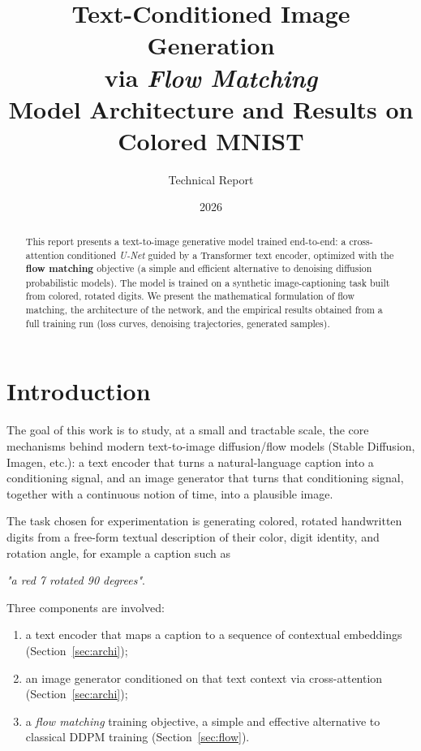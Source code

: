 \documentclass[11pt,a4paper]{article}
\title{\textbf{Text-Conditioned Image Generation\\ via \emph{Flow Matching}}\\[0.3em]
\large Model Architecture and Results on Colored MNIST}
\author{Technical Report}
\date{2026}
\begin{document}
\maketitle

\begin{abstract}
\noindent
This report presents a text-to-image generative model trained end-to-end: a
cross-attention conditioned \emph{U-Net} guided by a Transformer text
encoder, optimized with the \textbf{flow matching} objective (a simple and
efficient alternative to denoising diffusion probabilistic models). The
model is trained on a synthetic image-captioning task built from colored,
rotated digits. We present the mathematical formulation of flow matching,
the architecture of the network, and the empirical results obtained from a
full training run (loss curves, denoising trajectories, generated samples).
\end{abstract}

\tableofcontents

\section{Introduction}

The goal of this work is to study, at a small and tractable scale, the core
mechanisms behind modern text-to-image diffusion/flow models (Stable
Diffusion, Imagen, etc.): a text encoder that turns a natural-language
caption into a conditioning signal, and an image generator that turns that
conditioning signal, together with a continuous notion of time, into a
plausible image.

The task chosen for experimentation is generating colored, rotated
handwritten digits from a free-form textual description of their color,
digit identity, and rotation angle, for example a caption such as
\begin{center}
\textit{"a red 7 rotated 90 degrees"}.
\end{center}

Three components are involved:
\begin{enumerate}
  \item a text encoder that maps a caption to a sequence of contextual
        embeddings (Section~\ref{sec:archi});
  \item an image generator conditioned on that text context via
        cross-attention (Section~\ref{sec:archi});
  \item a \emph{flow matching} training objective, a simple and effective
        alternative to classical DDPM training (Section~\ref{sec:flow}).
\end{enumerate}
\end{document}
